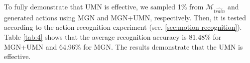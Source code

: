 To fully demonstrate that UMN is effective, we sampled 1\% from $\mathcal{M}_{\hat{train}}$ and generated actions using MGN and MGN+UMN, respectively. Then, it is tested according to the action recognition experiment (sec. \ref{sec:motion recognition}). 
Table \ref{tab:4} shows that the average recognition accuracy is 81.48\% for MGN+UMN and 64.96\% for MGN. The results demonstrate that the UMN is effective.

\begin{table}
  \centering
  \caption{Comparison of Top-1 accuracy of MGN($\mathcal{L}_{total}$) and MGN($\mathcal{L}_{total}$)+UMN. Sampling 1\% from $\mathcal{M}_{\hat{train}}$ for action generation.}
  \label{tab:4}
\end{table}
